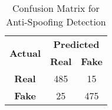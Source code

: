 \begin{table}[htbp]
\centering
\caption{Confusion Matrix for Anti-Spoofing Detection}
\label{tab:confusion_matrix}
\begin{tabular}{|c|c|c|}
\hline
\multirow{2}{*}{\textbf{Actual}} & \multicolumn{2}{c|}{\textbf{Predicted}} \\
\cline{2-3}
 & \textbf{Real} & \textbf{Fake} \\
\hline
\textbf{Real} & 485 & 15 \\
\hline
\textbf{Fake} & 25 & 475 \\
\hline
\end{tabular}
\end{table}